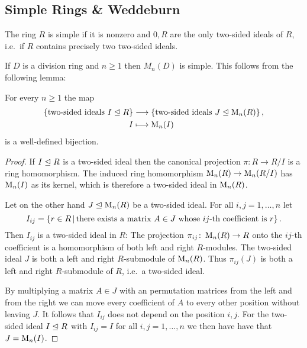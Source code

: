 \subsection{Simple Rings \& Weddeburn}


\begin{definition}
  The ring $R$ is simple if it is nonzero and $0, R$ are the only two-sided ideals of $R$, i.e.\ if $R$ contains precisely two two-sided ideals.
\end{definition}


\begin{example}
  \label{example: matrix algebra over skew field is simple}
  If $D$ is a division ring and $n \geq 1$ then $M_n(D)$ is simple.
  This follows from the following lemma:
\end{example}


\begin{lemma}
  For every $n \geq 1$ the map
  \begin{align*}
              \{ \text{two-sided ideals $I \trianglelefteq R$} \}
    &\longrightarrow  \{ \text{two-sided ideals $J \trianglelefteq \operatorname{M}_n(R)$} \} \,,
    \\
                  I
    &\longmapsto  \operatorname{M}_n(I)
  \end{align*}
  is a well-defined bijection.
\end{lemma}


\begin{proof}
  If $I \trianglelefteq R$ is a two-sided ideal then the canonical projection $\pi \colon R \to R/I$ is a ring homomorphism.
  The induced ring homomorphism $\operatorname{M}_n(R) \to \operatorname{M}_n(R/I)$ has $\operatorname{M}_n(I)$ as its kernel, which is therefore a two-sided ideal in $\operatorname{M}_n(R)$.
  
  Let on the other hand $J \trianglelefteq \operatorname{M}_n(R)$ be a two-sided ideal.
  For all $i, j = 1, \dotsc, n$ let
  \[
      I_{ij}
    = \{
        r \in R
      \suchthat
        \text{there exists a matrix $A \in J$ whose $ij$-th coefficient is $r$}
      \} \,.
  \]
  Then $I_{ij}$ is a two-sided ideal in $R$:
  The projection $\pi_{ij} \colon \operatorname{M}_n(R) \to R$ onto the $ij$-th coefficient is a homomorphism of both left and right $R$-modules.
  The two-sided ideal $J$ is both a left and right $R$-submodule of $\operatorname{M}_n(R)$.
  Thus $\pi_{ij}(J)$ is both a left and right $R$-submodule of $R$, i.e.\ a two-sided ideal.
  
  By multiplying a matrix $A \in J$ with an permutation matrices from the left and from the right we can move every coefficient of $A$ to every other position without leaving $J$.
  It follows that $I_{ij}$ does not depend on the position $i,j$.
  For the two-sided ideal $I \trianglelefteq R$ with $I_{ij} = I$ for all $i, j = 1, \dotsc, n$ we then have have that $J = \operatorname{M}_n(I)$.
\end{proof}


